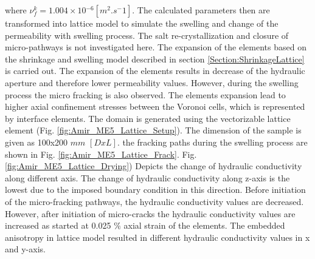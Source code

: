 where $\nu_f^{k}=1.004\times{10}{^{-6} [m^2.s^-1]}$. The calculated parameters then are transformed into lattice model to simulate the swelling and change of the permeability with swelling process. The salt re-crystallization and closure of micro-pathways is not investigated here. The expansion of the elements based on the shrinkage and swelling model described in section \ref{Section:ShrinkageLattice} is carried out. The expansion of the elements results in decrease of the hydraulic aperture and therefore lower permeability values. However, during the swelling process the micro fracking is also observed. The elements expansion lead to higher axial confinement stresses between the Voronoi cells, which is represented by interface elements. The domain is generated using the vectorizable lattice element (Fig. \ref{fig:Amir_ME5_Lattice_Setup}). The dimension of the sample is given as 100x200 $mm$ $[DxL]$. the fracking paths during the swelling process are shown in Fig.
\ref{fig:Amir_ME5_Lattice_Frack}. Fig. \ref{fig:Amir_ME5_Lattice_Drying}) Depicts the change of hydraulic conductivity along different axis. The change of hydraulic conductivity along z-axis is the lowest due to the imposed boundary condition in this direction. Before initiation of the micro-fracking pathways, the hydraulic conductivity values are decreased. However, after initiation of micro-cracks the hydraulic conductivity values are increased as started at 0.025 $\%$ axial strain of the elements. The embedded anisotropy in lattice model resulted in different hydraulic conductivity values in x and y-axis.

